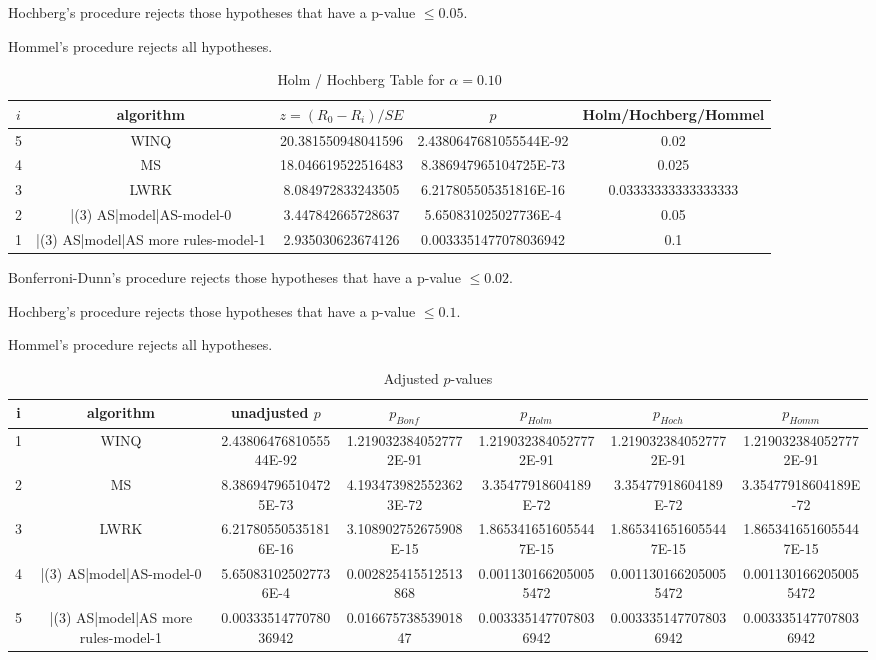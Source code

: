 \documentclass[a3paper,10pt]{article}
\begin{document}
Hochberg's procedure rejects those hypotheses that have a p-value $\le0.05$.


Hommel's procedure rejects all hypotheses.


\begin{table}[!htp]
\centering\tiny
\caption{Holm / Hochberg Table for $\alpha=0.10$}
\begin{tabular}{ccccc}
$i$&algorithm&$z=(R_0 - R_i)/SE$&$p$&Holm/Hochberg/Hommel\\
\hline
5&WINQ&20.381550948041596&2.4380647681055544E-92&0.02\\
4&MS&18.046619522516483&8.386947965104725E-73&0.025\\
3&LWRK&8.084972833243505&6.217805505351816E-16&0.03333333333333333\\
2&|(3) AS|model|AS-model-0&3.447842665728637&5.650831025027736E-4&0.05\\
1&|(3) AS|model|AS more rules-model-1&2.935030623674126&0.0033351477078036942&0.1\\
\hline
\end{tabular}
\end{table}
Bonferroni-Dunn's procedure rejects those hypotheses that have a p-value $\le0.02$.


Hochberg's procedure rejects those hypotheses that have a p-value $\le0.1$.


Hommel's procedure rejects all hypotheses.


\begin{table}[!htp]
\centering\tiny
\caption{Adjusted $p$-values}
\begin{tabular}{ccccccc}
i&algorithm&unadjusted $p$&$p_{Bonf}$&$p_{Holm}$&$p_{Hoch}$&$p_{Homm}$\\
\hline
1&WINQ&2.4380647681055544E-92&1.2190323840527772E-91&1.2190323840527772E-91&1.2190323840527772E-91&1.2190323840527772E-91\\
2&MS&8.386947965104725E-73&4.1934739825523623E-72&3.35477918604189E-72&3.35477918604189E-72&3.35477918604189E-72\\
3&LWRK&6.217805505351816E-16&3.108902752675908E-15&1.8653416516055447E-15&1.8653416516055447E-15&1.8653416516055447E-15\\
4&|(3) AS|model|AS-model-0&5.650831025027736E-4&0.002825415512513868&0.0011301662050055472&0.0011301662050055472&0.0011301662050055472\\
5&|(3) AS|model|AS more rules-model-1&0.0033351477078036942&0.01667573853901847&0.0033351477078036942&0.0033351477078036942&0.0033351477078036942\\
\hline
\end{tabular}
\end{table}
\end{document}
